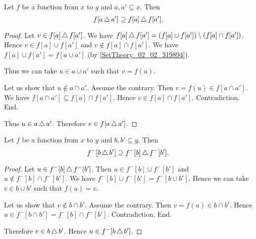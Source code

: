 \documentclass[../../set-theory.ftl.tex]{subfiles}
\begin{document}
  \begin{forthel}
    \begin{proposition}\label{SetTheory_02_04_657921}
      Let $f$ be a function from $x$ to $y$ and $a,a' \subseteq x$.
      Then \[ f[a \mathop{\triangle} a'] \supseteq f[a] \mathop{\triangle} f[a']. \]
    \end{proposition}
    \begin{proof}
      Let $v \in f[a] \mathop{\triangle} f[a']$.
      We have $f[a] \mathop{\triangle} f[a'] = (f[a] \cup f[a']) \setminus (f[a] \cap f[a'])$.
      Hence $v \in f[a] \cup f[a']$ and $v \notin f[a] \cap f[a']$.
      We have $f[a] \cup f[a'] = f[a \cup a']$ (by \ref{SetTheory_02_02_319894}).

      Thus we can take $u \in a \cup a'$ such that $v = f(u)$.

      Let us show that $u \notin a \cap a'$.
        Assume the contrary.
        Then $v = f(u) \in f[a \cap a']$.
        We have $f[a \cap a'] \subseteq f[a] \cap f[a']$.
        Hence $v \in f[a] \cap f[a']$.
        Contradiction.
      End.

      Thus $u \in a \mathop{\triangle} a'$.
      Therefore $v \in f[a \mathop{\triangle} a']$.
    \end{proof}


    \begin{proposition}\label{SetTheory_02_04_661750}
      Let $f$ be a function from $x$ to $y$ and $b,b' \subseteq y$.
      Then \[ f^{-}[b \mathop{\triangle} b'] \supseteq f^{-}[b] \mathop{\triangle} f^{-}[b']. \]
    \end{proposition}
    \begin{proof}
      Let $u \in f^{-}[b] \mathop{\triangle} f^{-}[b']$.
      Then $u \in f^{-}[b] \cup f^{-}[b']$ and $u \notin f^{-}[b] \cap f^{-}[b']$.
      We have $f^{-}[b] \cup f^{-}[b'] = f^{-}[b \cup b']$.
      Hence we can take $v \in b \cup b'$ such that $f(u) = v$.

      Let us show that $v \notin b \cap b'$.
        Assume the contrary.
        Then $v = f(u) \in b \cap b'$.
        Hence $u \in f^{-}[b \cap b'] = f^{-}[b] \cap f^{-}[b']$.
        Contradiction.
      End.

      Therefore $v \in b \mathop{\triangle} b'$.
      Hence $u \in f^{-}[b \mathop{\triangle} b']$.
    \end{proof}
  \end{forthel}
\end{document}
